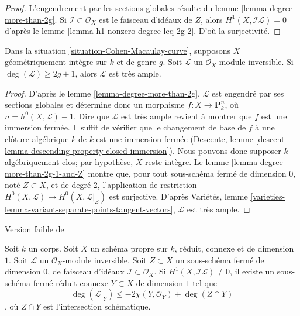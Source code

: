 \begin{proof}
L'engendrement par les sections globales résulte du lemme \ref{lemma-degree-more-than-2g}. Si $\mathcal{I} \subset \mathcal{O}_X$ est le faisceau d'idéaux de $Z$, alors $H^1(X, \mathcal{I}\mathcal{L}) = 0$ d'après le lemme \ref{lemma-h1-nonzero-degree-leq-2g-2}. D'où la surjectivité.
\end{proof}

\begin{lemma}
\label{lemma-degree-at-least-2g+1}
Dans la situation \ref{situation-Cohen-Macaulay-curve}, supposons $X$ géométriquement intègre sur $k$ et de genre $g$. Soit $\mathcal{L}$ un $\mathcal{O}_X$-module inversible. Si $\deg(\mathcal{L}) \geq 2g + 1$, alors $\mathcal{L}$ est très ample.
\end{lemma}

\begin{proof}
D'après le lemme \ref{lemma-degree-more-than-2g}, $\mathcal{L}$ est engendré par ses sections globales et détermine donc un morphisme $f : X \to \mathbf{P}^n_k$, où $n = h^0(X,\mathcal{L}) - 1$. Dire que $\mathcal{L}$ est très ample revient à montrer que $f$ est une immersion fermée. Il suffit de vérifier que le changement de base de $f$ à une clôture algébrique $\overline{k}$ de $k$ est une immersion fermée (Descente, lemme \ref{descent-lemma-descending-property-closed-immersion}). Nous pouvons donc supposer $k$ algébriquement clos; par hypothèse, $X$ reste intègre. Le lemme \ref{lemma-degree-more-than-2g-1-and-Z} montre que, pour tout sous-schéma fermé de dimension $0$, noté $Z\subset X$, et de degré 2, l'application de restriction $H^0(X, \mathcal{L}) \to H^0(X, \mathcal{L}|_Z)$ est surjective. D'après Variétés, lemme \ref{varieties-lemma-variant-separate-points-tangent-vectors}, $\mathcal{L}$ est très ample.
\end{proof}


\begin{lemma}
\label{lemma-vanishing-on-gorenstein}
\begin{reference}
Version faible de \cite[Lemma 4]{Jongmin}
\end{reference}
Soit $k$ un corps. Soit $X$ un schéma propre sur $k$, réduit, connexe et de dimension $1$. Soit $\mathcal{L}$ un $\mathcal{O}_X$-module inversible. Soit $Z \subset X$ un sous-schéma fermé de dimension $0$, de faisceau d'idéaux $\mathcal{I} \subset \mathcal{O}_X$. Si $H^1(X, \mathcal{I}\mathcal{L}) \not = 0$, il existe un sous-schéma fermé réduit connexe $Y \subset X$ de dimension $1$ tel que
$$
\deg(\mathcal{L}|_Y) \leq -2\chi(Y, \mathcal{O}_Y) + \deg(Z \cap Y)
$$, où $Z \cap Y$ est l'intersection schématique.
\end{lemma}

